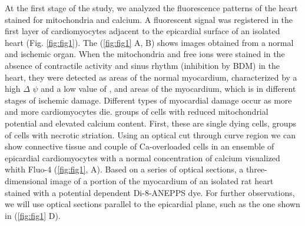 \documentclass{biophys-new}
\begin{document}
At the first stage of the study, we analyzed the fluorescence patterns of the heart stained for mitochondria and calcium.
A fluorescent signal was registered in the first layer of cardiomyocytes adjacent to the epicardial surface of an isolated heart (Fig. \ref{fig:fig1}).
The (\ref{fig:fig1} A, B) shows images obtained from a normal and ischemic organ.
When the mitochondria and free  ions were stained in the absence of contractile activity and sinus rhythm (inhibition by BDM) in the heart, they were detected as areas of the normal myocardium, characterized by a high $\Delta$ $\psi$ and a low value of , and areas of the myocardium, which is in different stages of ischemic damage.
Different types of myocardial damage occur as more and more cardiomyocytes die.
groups of cells with reduced mitochondrial potential and elevated calcium content.
First, these are single dying cells, groups of cells with necrotic striation.
Using an optical cut through curve region we can show connective tissue and couple of Ca-overloaded cells in an ensemble of epicardial cardiomyocytes with a normal concentration of calcium visualized whith Fluo-4 (\ref{fig:fig1}, A).
Based on a series of optical sections, a three-dimensional image of a portion of the myocardium of an isolated rat heart stained with a potential dependent Di-8-ANEPPS dye.
For further observations, we will use optical sections parallel to the epicardial plane, such as the one shown in (\ref{fig:fig1} D).
\end{document}

